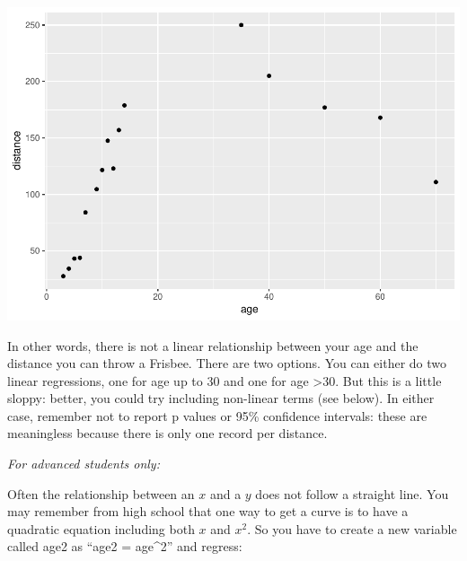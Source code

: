 \documentclass[]{book}
\newenvironment{Shaded}{\begin{snugshade}}{\end{snugshade}}
\newcommand{\DataTypeTok}[1]{\textcolor[rgb]{0.13,0.29,0.53}{#1}}
\newcommand{\DecValTok}[1]{\textcolor[rgb]{0.00,0.00,0.81}{#1}}
\newcommand{\KeywordTok}[1]{\textcolor[rgb]{0.13,0.29,0.53}{\textbf{#1}}}
\newcommand{\NormalTok}[1]{#1}
\newcommand{\OperatorTok}[1]{\textcolor[rgb]{0.81,0.36,0.00}{\textbf{#1}}}
\newcommand{\StringTok}[1]{\textcolor[rgb]{0.31,0.60,0.02}{#1}}
\begin{document}
\includegraphics{09-answers_files/figure-latex/week53-1.pdf}

In other words, there is not a linear relationship between your age and the distance you can throw a Frisbee. There are two options. You can either do two linear regressions, one for age up to 30 and one for age \textgreater30. But this is a little sloppy: better, you could try including non-linear terms (see below). In either case, remember not to report p values or 95\% confidence intervals: these are meaningless because there is only one record per distance.

\emph{For advanced students only:}

Often the relationship between an \(x\) and a \(y\) does not follow a straight line. You may remember from high school that one way to get a curve is to have a quadratic equation including both \(x\) and \(x^2\). So you have to create a new variable called age2 as ``age2 = age\^{}2'' and regress:

\begin{Shaded}
\end{Shaded}
\end{document}
